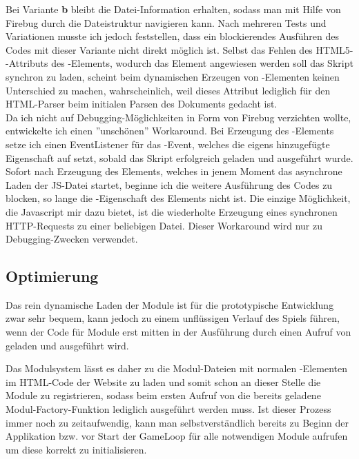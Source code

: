 Bei Variante \textbf{b} bleibt die Datei-Information erhalten, sodass man mit Hilfe von Firebug durch die Dateistruktur navigieren kann. Nach mehreren Tests und Variationen musste ich jedoch feststellen, dass ein blockierendes Ausführen des Codes mit dieser Variante nicht direkt möglich ist. Selbst das Fehlen des HTML5--Attributs des -Elements, wodurch das Element angewiesen werden soll das Skript synchron zu laden, scheint beim dynamischen Erzeugen von -Elementen keinen Unterschied zu machen, wahrscheinlich, weil dieses Attribut lediglich für den HTML-Parser beim initialen Parsen des Dokuments gedacht ist. \\
Da ich nicht auf Debugging-Möglichkeiten in Form von Firebug verzichten wollte, entwickelte ich einen ''unschönen'' Workaround. Bei Erzeugung des -Elements setze ich einen EventListener für das -Event, welches die eigens hinzugefügte Eigenschaft  auf  setzt, sobald das Skript erfolgreich geladen und ausgeführt wurde. Sofort nach Erzeugung des Elements, welches in jenem Moment das asynchrone Laden der JS-Datei startet, beginne ich die weitere Ausführung des Codes zu blocken, so lange die -Eigenschaft des Elements nicht  ist. Die einzige Möglichkeit, die Javascript mir dazu bietet, ist die wiederholte Erzeugung eines synchronen HTTP-Requests zu einer beliebigen Datei. Dieser Workaround wird nur zu Debugging-Zwecken verwendet.

\subsection{Optimierung}
Das rein dynamische Laden der Module ist für die prototypische Entwicklung zwar sehr bequem, kann jedoch zu einem unflüssigen Verlauf des Spiels führen, wenn der Code für Module erst mitten in der Ausführung durch einen Aufruf von  geladen und ausgeführt wird.

Das Modulsystem lässt es daher zu die Modul-Dateien mit normalen -Elementen im HTML-Code der Website zu laden und somit schon an dieser Stelle die Module zu registrieren, sodass beim ersten Aufruf von  die bereits geladene Modul-Factory-Funktion lediglich ausgeführt werden muss. Ist dieser Prozess immer noch zu zeitaufwendig, kann man selbstverständlich bereits zu Beginn der Applikation bzw. vor Start der GameLoop  für alle notwendigen Module aufrufen um diese korrekt zu initialisieren.